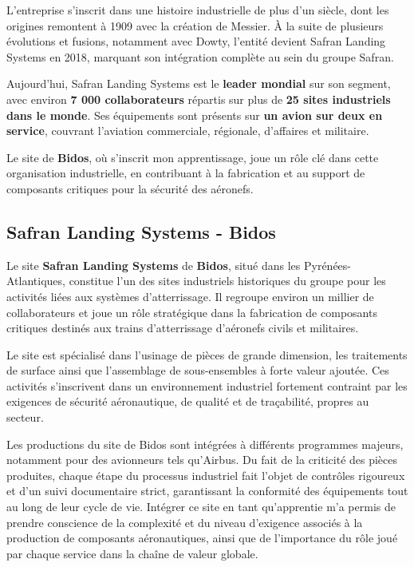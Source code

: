 \noindent L’entreprise s’inscrit dans une histoire industrielle de plus d’un siècle, dont les origines remontent à 1909 avec la création de Messier. À la suite de plusieurs évolutions et fusions, notamment avec Dowty, l’entité devient Safran Landing Systems en 2018, marquant son intégration complète au sein du groupe Safran.

\noindent Aujourd’hui, Safran Landing Systems est le \textbf{leader mondial} sur son segment, avec environ \textbf{7 000 collaborateurs} répartis sur plus de \textbf{25 sites industriels dans le monde}. Ses équipements sont présents sur \textbf{un avion sur deux en service}, couvrant l’aviation commerciale, régionale, d’affaires et militaire.

\noindent Le site de \textbf{Bidos}, où s’inscrit mon apprentissage, joue un rôle clé dans cette organisation industrielle, en contribuant à la fabrication et au support de composants critiques pour la sécurité des aéronefs.


\subsection*{Safran Landing Systems - Bidos}
{}
Le site \textbf{Safran Landing Systems} de \textbf{Bidos}, situé dans les Pyrénées-Atlantiques, constitue l’un des sites industriels historiques du groupe pour les activités liées aux systèmes d’atterrissage. Il regroupe environ un millier de collaborateurs et joue un rôle stratégique dans la fabrication de composants critiques destinés aux trains d’atterrissage d’aéronefs civils et militaires.

\noindent Le site est spécialisé dans l’usinage de pièces de grande dimension, les traitements de surface ainsi que l’assemblage de sous-ensembles à forte valeur ajoutée. Ces activités s’inscrivent dans un environnement industriel fortement contraint par les exigences de sécurité aéronautique, de qualité et de traçabilité, propres au secteur.

\noindent Les productions du site de Bidos sont intégrées à différents programmes majeurs, notamment pour des avionneurs tels qu’Airbus. Du fait de la criticité des pièces produites, chaque étape du processus industriel fait l’objet de contrôles rigoureux et d’un suivi documentaire strict, garantissant la conformité des équipements tout au long de leur cycle de vie. \noindent Intégrer ce site en tant qu’apprentie m’a permis de prendre conscience de la complexité et du niveau d’exigence associés à la production de composants aéronautiques, ainsi que de l’importance du rôle joué par chaque service dans la chaîne de valeur globale.

